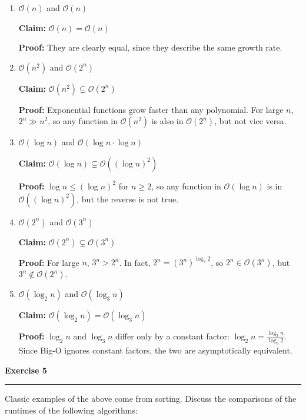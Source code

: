 \documentclass{article}
\theoremstyle{theorem}
\theoremstyle{definition}
\theoremstyle{remark}
\begin{document}
\begin{enumerate}
    \item \( \mathcal{O}(n) \) and \( \mathcal{O}(n) \)

    \textbf{Claim:} \( \mathcal{O}(n) = \mathcal{O}(n) \)

    \textbf{Proof:} They are clearly equal, since they describe the same growth rate.

    \item \( \mathcal{O}(n^2) \) and \( \mathcal{O}(2^n) \)

    \textbf{Claim:} \( \mathcal{O}(n^2) \subsetneq \mathcal{O}(2^n) \)

    \textbf{Proof:} Exponential functions grow faster than any polynomial. For large \( n \), \( 2^n \gg n^2 \), so any function in \( \mathcal{O}(n^2) \) is also in \( \mathcal{O}(2^n) \), but not vice versa.

    \item \( \mathcal{O}(\log n) \) and \( \mathcal{O}(\log n \cdot \log n) \)

    \textbf{Claim:} \( \mathcal{O}(\log n) \subsetneq \mathcal{O}((\log n)^2) \)

    \textbf{Proof:} \( \log n \leq (\log n)^2 \) for \( n \geq 2 \), so any function in \( \mathcal{O}(\log n) \) is in \( \mathcal{O}((\log n)^2) \), but the reverse is not true.

    \item \( \mathcal{O}(2^n) \) and \( \mathcal{O}(3^n) \)

    \textbf{Claim:} \( \mathcal{O}(2^n) \subsetneq \mathcal{O}(3^n) \)

    \textbf{Proof:} For large \( n \), \( 3^n > 2^n \). In fact, \( 2^n = (3^n)^{\log_3 2} \), so \( 2^n \in \mathcal{O}(3^n) \), but \( 3^n \notin \mathcal{O}(2^n) \).

    \item \( \mathcal{O}(\log_2 n) \) and \( \mathcal{O}(\log_3 n) \)

    \textbf{Claim:} \( \mathcal{O}(\log_2 n) = \mathcal{O}(\log_3 n) \)

    \textbf{Proof:} \( \log_2 n \) and \( \log_3 n \) differ only by a constant factor: \( \log_2 n = \frac{\log_3 n}{\log_3 2} \). Since Big-O ignores constant factors, the two are asymptotically equivalent.
\end{enumerate}

\textbf{Exercise 5}
\vspace{0.5em}
\hrule
\vspace{0.5em}
Classic examples of the above come from sorting. Discuss the comparisons of the runtimes of the following algorithms:
\end{document}
